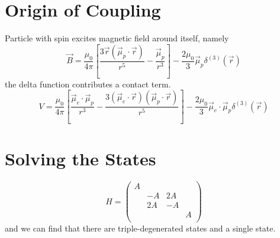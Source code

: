 \section[自旋轨道耦合的来源]{Origin of Coupling}
Particle with spin excites magnetic field around itself, namely
\begin{equation}
  \vec{B} = \frac{\mu_0}{4\pi}\left[ \frac{3\vec{r} \left( \vec{\mu}_{p} \cdot \vec{r} \right) }{r^{5}} - \frac{\vec{\mu}_{p}}{r^{3}} \right] - \frac{2\mu_0}{3} \vec{\mu}_{p} \delta^{(3)} \left( \vec{r} \right) 
\end{equation}
the delta function contributes a contact term.
\begin{equation}
  V = \frac{\mu_0}{4\pi} \left[ \frac{\vec{\mu}_{e}\cdot \vec{\mu}_{p}}{r^{3}} - \frac{3\left( \vec{\mu}_{e} \cdot \vec{r} \right) \left( \vec{\mu}_{p} \cdot \vec{r} \right) }{r^{5}} \right] - \frac{2\mu_0}{3} \vec{\mu}_{e} \cdot \vec{\mu}_{p} \delta^{(3)} \left( \vec{r} \right) 
\end{equation}

\section[求解能量本征态]{Solving the States}
\begin{equation}
  H = \begin{pmatrix}
   A &  &  & \\
    & -A & 2A & \\
    & 2A & -A & \\
    &  &  & A\\
  \end{pmatrix}
\end{equation}
and we can find that there are triple-degenerated states and a single state.
